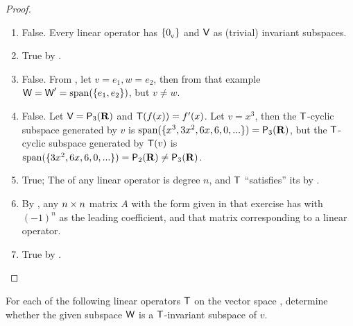 \begin{proof} \ 

\begin{enumerate}
\item False. Every linear operator has \(\{ 0_{_{\textsf{V}}} \}\) and \(\textsf{V}\) as (trivial) invariant subspaces.
\item True by .
\item False.
From , let \(v = e_1, w = e_2\), then from that example \(\textsf{W} = \textsf{W}' = \operatorname{span}(\{ e_1, e_2 \})\), but \(v \ne w\).

\item False. Let \(\textsf{V} = \textsf{P}_3(\mathbf{R})\) and \(\textsf{T}(f(x)) = f'(x)\).
Let \(v = x^3\), then the \(\textsf{T}\)-cyclic subspace generated by \(v\) is \(\operatorname{span}(\{ x^3, 3x^2, 6x, 6, 0, ... \}) = \textsf{P}_3(\mathbf{R})\), but the \(\textsf{T}\)-cyclic subspace generated by \(\textsf{T}(v)\) is \(\operatorname{span}(\{ 3x^2, 6x, 6, 0, ... \}) = \textsf{P}_2(\mathbf{R}) \ne \textsf{P}_3(\mathbf{R})\).
\item True; The \CPOLY{} of any linear operator is degree \(n\), and \(\textsf{T}\) ``satisfies'' its \CPOLY{} by .
\item By , any \(n \times n\) matrix \(A\) with the form given in that exercise has \CPOLY{} with \((-1)^n\) as the leading coefficient, and that matrix corresponding to a linear operator.
\item True by .
\end{enumerate}
\end{proof}

\begin{exercise} \label{exercise 5.4.2}
For each of the following linear operators \(\textsf{T}\) on the vector space \V, determine whether the given subspace \(\textsf{W}\) is a \(\textsf{T}\)-invariant subspace of \(v\).
\end{exercise}

